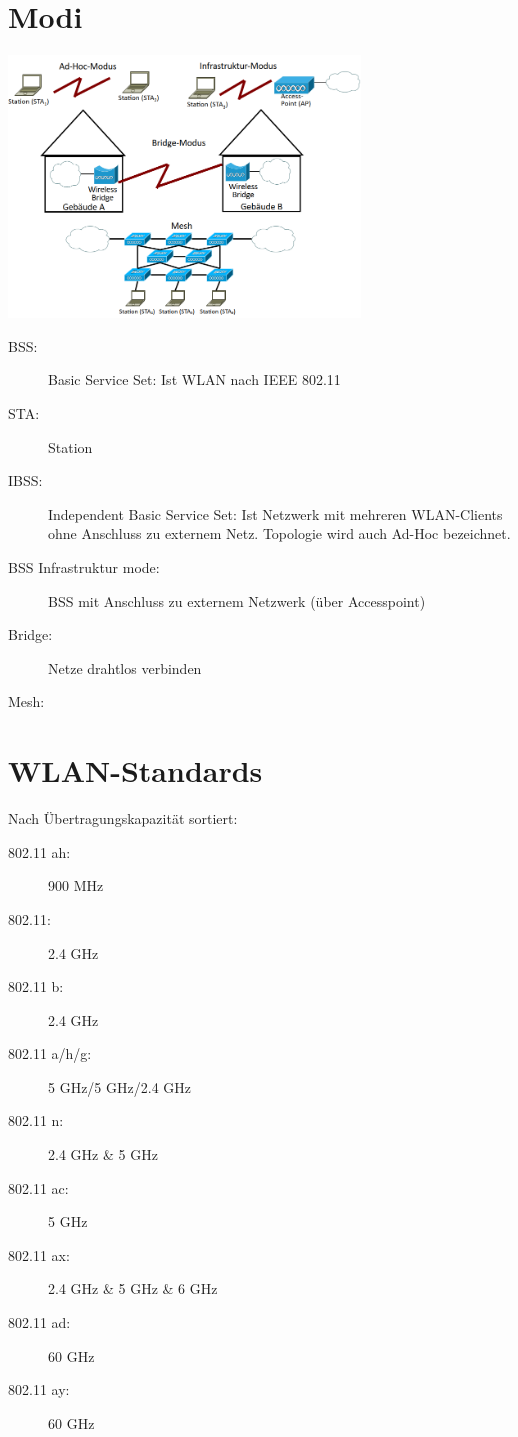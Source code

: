 \documentclass[12pt,a4paper]{article}
\begin{document}
\section{Modi}
	\includegraphics[width=0.7\textwidth]{Bilder/Funkmodi.png}

	\begin{description}
		\item[BSS:] Basic Service Set: Ist WLAN nach IEEE 802.11
		\item[STA:] Station 
		\item[IBSS:] Independent Basic Service Set: Ist Netzwerk mit mehreren WLAN-Clients ohne Anschluss zu externem Netz. Topologie wird auch Ad-Hoc bezeichnet.
		\item[BSS Infrastruktur mode:] BSS mit Anschluss zu externem Netzwerk (über Accesspoint) 
		\item[Bridge:] Netze drahtlos verbinden
		\item[Mesh:] 
	\end{description}

\section{WLAN-Standards}
	Nach Übertragungskapazität sortiert:
	\begin{description}
		\item[802.11 ah:] 900 MHz
		\item[802.11:] 2.4 GHz
		\item[802.11 b:] 2.4 GHz
		\item[802.11 a/h/g:] 5 GHz/5 GHz/2.4 GHz
		\item[802.11 n:] 2.4 GHz \& 5 GHz
		\item[802.11 ac:] 5 GHz
		\item[802.11 ax:] 2.4 GHz \& 5 GHz \& 6 GHz
		\item[802.11 ad:] 60 GHz
		\item[802.11 ay:] 60 GHz
	\end{description}
\end{document}
